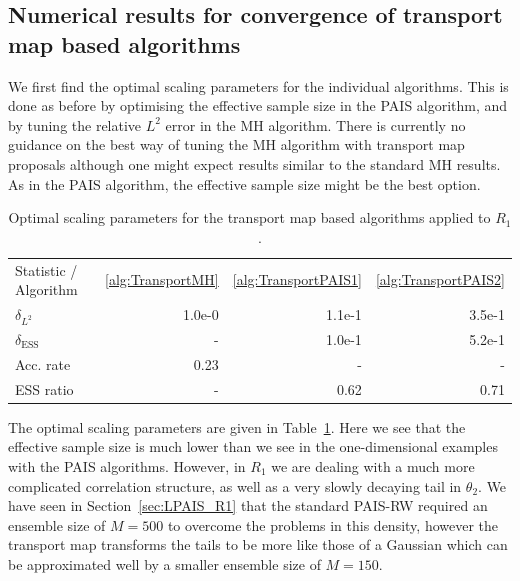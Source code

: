 \documentclass[final]{siamltex}
\begin{document}
\subsection[Numerical results]{Numerical results for convergence of transport map based algorithms}

We first find the optimal scaling parameters for the individual algorithms. This is done as before by optimising the effective sample size in the PAIS algorithm, and by tuning the relative $L^2$ error in the MH algorithm. There is currently no guidance on the best way of tuning the MH algorithm with transport map proposals although one might expect results similar to the standard MH results. As in the PAIS algorithm, the effective sample size might be the best option.

\begin{table}[!h]
\centering
\begin{tabular}{lrrr}
\toprule
	Statistic \quad / \quad Algorithm & \ref{alg:TransportMH} & \ref{alg:TransportPAIS1} & \ref{alg:TransportPAIS2}  \\ \cmidrule(lr){1-4}
	$\delta_{L^2}$				 & 1.0e-0 & 1.1e-1 & 3.5e-1 \\
	$\delta_{\text{ESS}}$				 & - & 1.0e-1 & 5.2e-1 \\ \cmidrule(lr){1-4}
	Acc. rate							 & 0.23 & - & - \\
	ESS ratio							 & - & 0.62 & 0.71 \\
\bottomrule
\end{tabular}
\caption{Optimal scaling parameters for the transport map based algorithms applied to $R_1$.}
\label{tab:R2_opt_scaling}
\end{table}

The optimal scaling parameters are given in Table~\ref{tab:R2_opt_scaling}. Here we see that the effective sample size is much lower than we see in the one-dimensional examples with the PAIS algorithms. However, in $R_1$ we are dealing with a much more complicated correlation structure, as well as a very slowly decaying tail in $\theta_2$. We have seen in Section~\ref{sec:LPAIS_R1} that the standard PAIS-RW required an ensemble size of $M=500$ to overcome the problems in this density, however the transport map transforms the tails to be more like those of a Gaussian which can be approximated well by a smaller ensemble size of $M=150$.
\end{document}
